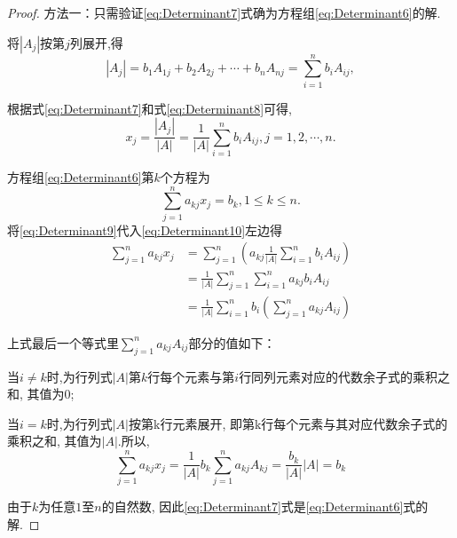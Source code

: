 \begin{proof}

  方法一：只需验证\eqref{eq:Determinant7}式确为方程组\eqref{eq:Determinant6}的解.

  将$|A_j|$按第$j$列展开,得
  \begin{equation}\label{eq:Determinant8}
    |A_j|=b_1A_{1j}+b_2A_{2j}+\cdots+b_nA_{nj}=\sum\limits_{i=1}^nb_iA_{ij},
  \end{equation}

  根据式\eqref{eq:Determinant7}和式\eqref{eq:Determinant8}可得,
  \begin{equation}\label{eq:Determinant9}
    x_j=\frac{|A_j|}{|A|}=\frac{1}{|A|}\sum\limits_{i=1}^nb_iA_{ij},
    j=1,2,\cdots,n.
  \end{equation}

  方程组\eqref{eq:Determinant6}第$k$个方程为
  \begin{equation}\label{eq:Determinant10}
    \sum\limits_{j=1}^na_{kj}x_j=b_k, 1 \leq k \leq n.
  \end{equation}
  将\eqref{eq:Determinant9}代入\eqref{eq:Determinant10}左边得
  \begin{equation*}
    \begin{split}
    \sum\limits_{j=1}^na_{kj}x_j & =
    \sum\limits_{j=1}^n(a_{kj}\frac{1}{|A|}\sum\limits_{i=1}^nb_iA_{ij})\\
    & = \frac{1}{|A|}\sum\limits_{j=1}^n\sum\limits_{i=1}^na_{kj}b_iA_{ij}\\
    & = \frac{1}{|A|}\sum\limits_{i=1}^nb_i(\sum\limits_{j=1}^na_{kj}A_{ij})
    \end{split}
  \end{equation*}

  上式最后一个等式里$\sum\limits_{j=1}^na_{kj}A_{ij}$部分的值如下：

  当$i \neq k$时,为行列式$|A|$第$k$行每个元素与第$i$行同列元素对应的代数余子式的乘积之和,
  其值为0;

  当$i = k$时,为行列式$|A|$按第k行元素展开,
  即第k行每个元素与其对应代数余子式的乘积之和,
  其值为$|A|$.所以,
  \begin{equation*}
    \sum\limits_{j=1}^na_{kj}x_j
    = \frac{1}{|A|}b_k\sum\limits_{j=1}^na_{kj}A_{kj}
    = \frac{b_k}{|A|}|A|
    = b_k
  \end{equation*}

  由于$k$为任意$1$至$n$的自然数,
  因此\eqref{eq:Determinant7}式是\eqref{eq:Determinant6}式的解.


\end{proof}

